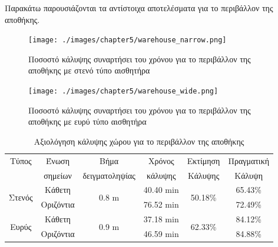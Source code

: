 Παρακάτω παρουσιάζονται τα αντίστοιχα αποτελέσματα για το περιβάλλον της αποθήκης.

\begin{figure}[!ht]
    \texttt{[image: ./images/chapter5/warehouse\_narrow.png]}
    \caption{Ποσοστό κάλυψης συναρτήσει του χρόνου για το περιβάλλον της αποθήκης με στενό τύπο αισθητήρα}
     \label{fig:warehouse_narrow}
\end{figure} 

\begin{figure}[!ht]
    \texttt{[image: ./images/chapter5/warehouse\_wide.png]}
    \caption{Ποσοστό κάλυψης συναρτήσει του χρόνου για το περιβάλλον της αποθήκης με ευρύ τύπο αισθητήρα}
     \label{fig:warehouse_wide}
\end{figure} 

\begin{table}[H]
    \begin{center}
        \caption{Αξιολόγηση κάλυψης χώρου για το περιβάλλον της αποθήκης}
        \label{tab:coverage_warehouse}
        \begin{tabular}{ | c | c | c | c | c | c |}
        \hline
        \rowcolor{Gray}
        Τύπος                   & Ένωση     & Βήμα                        & Χρόνος         & Εκτίμηση                 & Πραγματική \\
        \rowcolor{Gray}
                                & σημείων   & δειγματοληψίας              & κάλυψης        & Κάλυψης                  & Κάλυψη     \\
        \hline
        \multirow{2}{*}{Στενός} & Κάθετη    & \multirow{2}{*}{0.8 \si{m}} & 40.40 \si{min} & \multirow{2}{*}{50.18\%} & 65.43\%    \\
        \cline{2-2}\cline{4-4}\cline{6-6}
                                & Οριζόντια &                             & 76.52 \si{min} &                          & 72.49\%    \\
        \hline
        \multirow{2}{*}{Ευρύς} & Κάθετη     & \multirow{2}{*}{0.9 \si{m}} & 37.18 \si{min} & \multirow{2}{*}{62.33\%} & 84.12\%    \\
        \cline{2-2}\cline{4-4}\cline{6-6}
                               & Οριζόντια  &                             & 46.59 \si{min} &                          & 84.88\%    \\
        \hline
        \end{tabular}
    \end{center}
\end{table}

